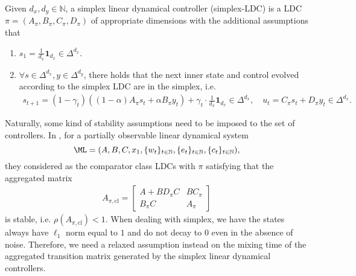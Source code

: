 \begin{definition}
\label{def:po-comparator-ldc}
Given $d_x, d_y\in\mathbb{N}$, a simplex linear dynamical controller (simplex-LDC) is a LDC $\pi=(A_{\pi}, B_{\pi}, C_{\pi}, D_{\pi})$ of appropriate dimensions with the additional assumptions that
\begin{enumerate}
\item $s_1=\frac{1}{d_x}\mathbf{1}_{d_x}\in\Delta^{d_x}$.
\item $\forall s\in\Delta^{d_x}, y\in\Delta^{d_y}$, there holds that the next inner state and control evolved according to the simplex LDC are in the simplex, i.e.
\begin{align*}
s_{t+1}=(1-\gamma_t)((1-\alpha)A_{\pi}s_t+\alpha B_{\pi}y_t)+\gamma_t\cdot\frac{1}{d_x}\mathbf{1}_{d_x}\in\Delta^{d_x}, \quad u_t=C_{\pi}s_t+D_{\pi}y_t\in\Delta^{d_x}. 
\end{align*} 
\end{enumerate}
\end{definition}
Naturally, some kind of stability assumptions need to be imposed to the set of controllers. In \citep{simchowitz2020improper}, for a partially observable linear dynamical system $$\ML=(A,B,C,x_1,\{w_t\}_{t\in\mathbb{N}}, \{e_t\}_{t\in\mathbb{N}}, \{c_t\}_{t\in\mathbb{N}}),$$ 
they considered as the comparator class LDCs with $\pi$ satisfying that the aggregated matrix
\begin{align*}
A_{\pi,\mathrm{cl}}=\begin{bmatrix}
A+BD_{\pi}C & BC_{\pi}\\
B_{\pi}C & A_{\pi}
\end{bmatrix}
\end{align*}
is stable, i.e. $\rho(A_{\pi,\mathrm{cl}})<1$. When dealing with simplex, we have the states always have $\ell_1$ norm equal to $1$ and do not decay to $0$ even in the absence of noise. Therefore, we need a relaxed assumption instead on the mixing time of the aggregated transition matrix generated by the simplex linear dynamical controllers.

